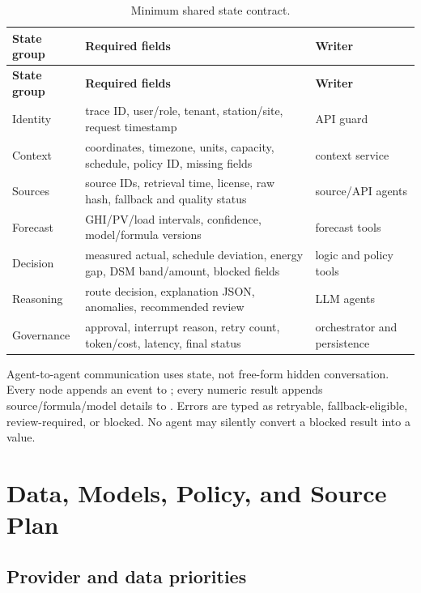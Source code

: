 \begin{footnotesize}
\begin{longtable}{@{}L{3.1cm}L{7.0cm}L{4.4cm}@{}}
\caption{Minimum shared state contract.}\label{tab:state}\\
\toprule
\textbf{State group} & \textbf{Required fields} & \textbf{Writer}\\
\midrule
\endfirsthead
\toprule
\textbf{State group} & \textbf{Required fields} & \textbf{Writer}\\
\midrule
\endhead
\bottomrule
\endfoot
Identity & trace ID, user/role, tenant, station/site, request timestamp & API guard\\
Context & coordinates, timezone, units, capacity, schedule, policy ID, missing fields &
context service\\
Sources & source IDs, retrieval time, license, raw hash, fallback and quality status &
source/API agents\\
Forecast & GHI/PV/load intervals, confidence, model/formula versions & forecast tools\\
Decision & measured actual, schedule deviation, energy gap, DSM band/amount, blocked fields &
logic and policy tools\\
Reasoning & route decision, explanation JSON, anomalies, recommended review & LLM agents\\
Governance & approval, interrupt reason, retry count, token/cost, latency, final status &
orchestrator and persistence\\
\end{longtable}
\end{footnotesize}

Agent-to-agent communication uses state, not free-form hidden conversation. Every node appends an
event to ; every numeric result appends source/formula/model details to
. Errors are typed as retryable, fallback-eligible, review-required, or
blocked. No agent may silently convert a blocked result into a value.

\section{Data, Models, Policy, and Source Plan}

\subsection{Provider and data priorities}

